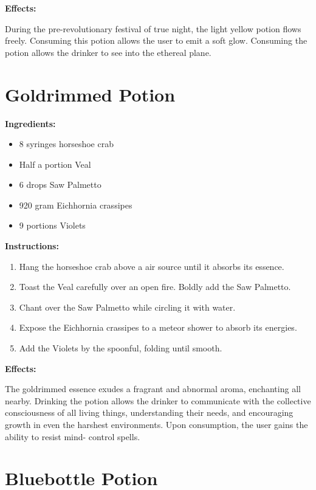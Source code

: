 \documentclass{article}
\begin{document}
\textbf{Effects:}

During the pre-revolutionary festival of true night, the light yellow potion flows freely. Consuming this potion allows the user to emit a soft glow. Consuming the potion allows the drinker to see into the ethereal plane.

\newpage
\section*{Goldrimmed Potion}

\textbf{Ingredients:}

\begin{itemize}
  \item 8 syringes horseshoe crab
  \item Half a portion Veal
  \item 6 drops Saw Palmetto
  \item 920 gram Eichhornia crassipes
  \item 9 portions Violets
\end{itemize}

\textbf{Instructions:}

\begin{enumerate}
  \item Hang the horseshoe crab above a air source until it absorbs its essence.
  \item Toast the Veal carefully over an open fire. Boldly add the Saw Palmetto.
  \item Chant over the Saw Palmetto while circling it with water.
  \item Expose the Eichhornia crassipes to a meteor shower to absorb its energies.
  \item Add the Violets by the spoonful, folding until smooth.
\end{enumerate}

\textbf{Effects:}

The goldrimmed essence exudes a fragrant and abnormal aroma, enchanting all nearby. Drinking the potion allows the drinker to communicate with the collective consciousness of all living things, understanding their needs, and encouraging growth in even the harshest environments. Upon consumption, the user gains the ability to resist mind- control spells.

\newpage
\section*{Bluebottle Potion}
\end{document}
